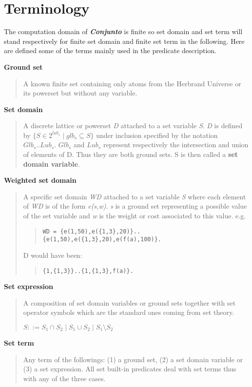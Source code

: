 \section{Terminology}
The computation domain of {\em\bf Conjunto} is finite so set
domain and set term will stand respectively for finite set domain and
finite set term in the following. Here are defined some of the terms
mainly used in the predicate description.

\noindent
{\bf Ground set}
\begin{quote} A known finite set containing only atoms from
the Herbrand Universe or its powerset but without any variable.
\end{quote}
{\bf Set domain}
\begin{quote}
A discrete lattice or powerset {\em D} attached to a set
variable {\em S}. {\em D} is defined by
{$\{S \in 2^{lub_s} \mid glb_s \subseteq S\}$}
under inclusion specified by the notation $Glb_s .. Lub_s$.
$Glb_s$ and $Lub_s$
represent respectively the intersection and union
of elements of D.  Thus they are both ground sets. S is then called a
{\bf set domain variable}.
\end{quote}
{\bf Weighted set domain}
\begin{quote} A specific set domain {\em WD} attached to
a set variable {\em S} where each element of {\em WD} is of the
form {\em e(s,w)}. {\em s} is a ground set representing a possible value of the
set variable and {\em w} is the weight or cost associated to this
value. e.g.
\begin{quote}\begin{verbatim}
WD = {e(1,50),e({1,3},20)}..{e(1,50),e({1,3},20),e(f(a),100)}.
\end{verbatim}\end{quote}
D would have been:
\begin{quote}\begin{verbatim}
{1,{1,3}}..{1,{1,3},f(a)}.
\end{verbatim}\end{quote}
\end{quote}
{\bf Set expression}
\begin{quote} A composition of set domain variables or ground sets together
with set operator symbols which are the standard ones coming from set
theory.

$S ::= S_1 \cap S_2 \mid S_1 \cup S_2 \mid S_1 \setminus S_2$

\end{quote}
{\bf Set term}
\begin{quote} Any term of the followings: (1) a ground set, (2) a
set domain  variable or (3)  a set expression. All set built-in
predicates deal with set terms thus with any of the three cases.
\end{quote}
